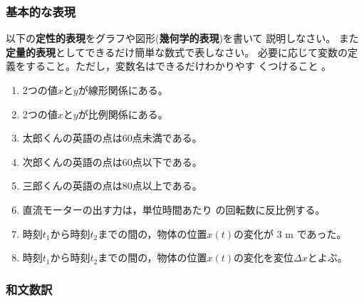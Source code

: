 \documentclass[twocolumn,11pt]{jarticle}
\begin{document}
\subsubsection{基本的な表現}
\nquestion
以下の\textbf{定性的表現}をグラフや図形(\textbf{幾何学的表現})を書いて
説明しなさい。
また\textbf{定量的表現}としてできるだけ簡単な数式で表しなさい。
必要に応じて変数の定義をすること。ただし，変数名はできるだけわかりやす
くつけること
。
\begin{enumerate}
\item\label{jitem:linear} 2つの値$x$と$y$が線形関係にある。
\item\label{jitem:prop} 2つの値$x$と$y$が比例関係にある。
\item\label{jitem:taro} 太郎くんの英語の点は60点未満である。
\item\label{jitem:jiro} 次郎くんの英語の点は60点以下である。
\item\label{jitem:sabu} 三郎くんの英語の点は80点以上である。
\item\label{jitem:Fn} 直流モーターの出す力は，単位時間あたり
  の回転数に反比例する。
\item 時刻$t_1$から時刻$t_2$までの間の，物体の位置$x(t)$の変化が 3 m であった。
\item 時刻$t_1$から時刻$t_2$までの間の，物体の位置$x(t)$の変化を変位$\Delta x$とよぶ。
\end{enumerate}

\subsubsection{和文数訳}
\end{document}
